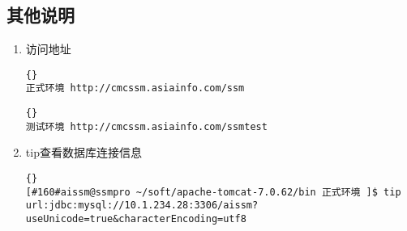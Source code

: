 \documentclass[10pt]{article}
\begin{document}
      \subsection {其他说明} 
	 \begin{enumerate}[注 1]
	 \item 访问地址
	\begin{lstlisting}[language={[ANSI]C}]{}
正式环境 http://cmcssm.asiainfo.com/ssm
	\end{lstlisting}
	\begin{lstlisting}[language={[ANSI]C}]{}
测试环境 http://cmcssm.asiainfo.com/ssmtest
	\end{lstlisting}
	\item tip查看数据库连接信息
	\begin{lstlisting}[language={[ANSI]C}]{}
[#160#aissm@ssmpro ~/soft/apache-tomcat-7.0.62/bin 正式环境 ]$ tip
url:jdbc:mysql://10.1.234.28:3306/aissm?useUnicode=true&characterEncoding=utf8	
	\end{lstlisting}
      	\end{enumerate}

     
\end{document}
